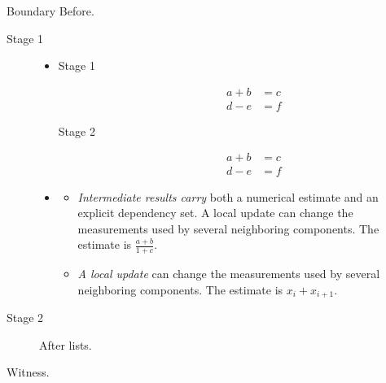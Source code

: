 \documentclass[11pt,aspectratio=169]{beamer}
\begin{document}
\begin{frame}[t]{Boundary}
Before.\par
\begin{description}
\item[Stage 1] \begin{itemize}
\item<1-> \begin{description}
\item[Stage 1] \[\begin{aligned}a+b&=c\\ d-e&=f\end{aligned}\]
\item[Stage 2] \[\begin{aligned}a+b&=c\\ d-e&=f\end{aligned}\]
\end{description}
\item<2-> \begin{itemize}
\item<1-> \textit{Intermediate results carry} both a numerical estimate and an explicit dependency set. A local update can change the measurements used by several neighboring components. The estimate is $\frac{a+b}{1+c}$.
\item<2-> \textit{A local update} can change the measurements used by several neighboring components. The estimate is $x_i+x_{i+1}$.
\end{itemize}
\end{itemize}
\item[Stage 2] After lists.
\end{description}
Witness.\par
\end{frame}
\end{document}
